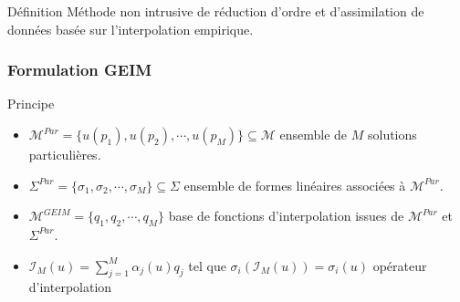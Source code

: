 \documentclass[a4paper,10pt]{beamer}
\numberwithin{equation}{section}
\begin{document}
\begin{frame}
\begin{block}{\sc Définition}
	Méthode non intrusive de réduction d'ordre et d'assimilation de données basée sur l'interpolation empirique. 
\end{block}

\end{frame}
\begin{frame}
\frametitle{\sc Formulation GEIM}
\begin{block}{\sc Principe}
	\begin{itemize}
		\item $\mathcal{M}^{Par}=\{u(p_{1}),u(p_{2}),\cdots ,u(p_{M}) \} \subseteq \mathcal{M}$ ensemble de $M$ solutions particulières.
		\item $\Sigma^{Par}=\{\sigma_{1},\sigma_{2},\cdots ,\sigma_{M}\} \subseteq \Sigma$ ensemble de formes linéaires associées à $\mathcal{M}^{Par}$.
		\item $\mathcal{M}^{GEIM}=
		\{q_{1},q_{2},\cdots,q_{M}\}$ base de fonctions d'interpolation issues de $\mathcal{M}^{Par}$ et $\Sigma^{Par}$. 
		\item $\mathcal{I}_{M}(u)=\sum_{j=1}^{M}\alpha_{j}(u)q_{j}$ tel que $\sigma_{i}(\mathcal{I}_{M}(u))=\sigma_{i}(u)$ opérateur d'interpolation
	\end{itemize}
\end{block}
\end{frame}
\end{document}
